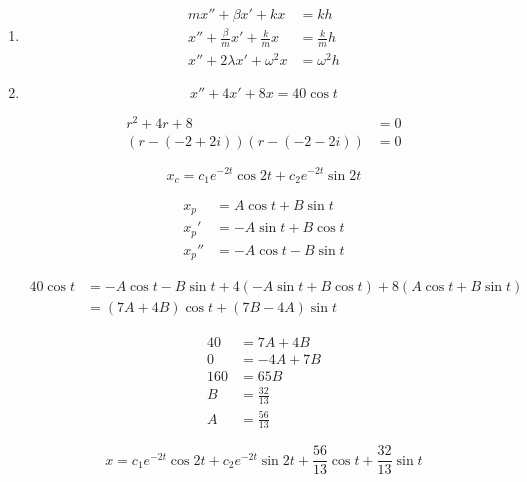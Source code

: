 \documentclass{article}
\begin{document}
\begin{enumerate}
  \item

        \begin{align*}
          m x'' + \beta x' + k x                   & = k h           \\
          x'' + \frac{\beta}{m} x' + \frac{k}{m} x & = \frac{k}{m} h \\
          x'' + 2 \lambda x' + \omega^2 x          & = \omega^2 h
        \end{align*}

  \item

        \[x'' + 4 x' + 8 x = 40 \cos t\]

        \begin{align*}
          r^2 + 4 r + 8                   & = 0 \\
          (r - (-2 + 2i)) (r - (-2 - 2i)) & = 0
        \end{align*}

        \[x_c = c_1 e^{-2t} \cos 2t + c_2 e^{-2t} \sin 2t\]

        \begin{align*}
          x_p   & = A \cos t + B \sin t  \\
          x_p'  & = -A \sin t + B \cos t \\
          x_p'' & = -A \cos t - B \sin t
        \end{align*}

        \begin{align*}
          40 \cos t & = -A \cos t - B \sin t + 4 (-A \sin t + B \cos t) + 8 (A \cos t + B \sin t) \\
                    & = (7 A + 4 B) \cos t + (7 B - 4 A) \sin t
        \end{align*}

        \begin{align*}
          40  & = 7 A + 4 B     \\
          0   & = -4 A + 7 B    \\
          160 & = 65 B          \\
          B   & = \frac{32}{13} \\
          A   & = \frac{56}{13}
        \end{align*}

        \[x = c_1 e^{-2t} \cos 2t + c_2 e^{-2t} \sin 2t + \frac{56}{13} \cos t + \frac{32}{13} \sin t\]


\end{enumerate}
\end{document}
